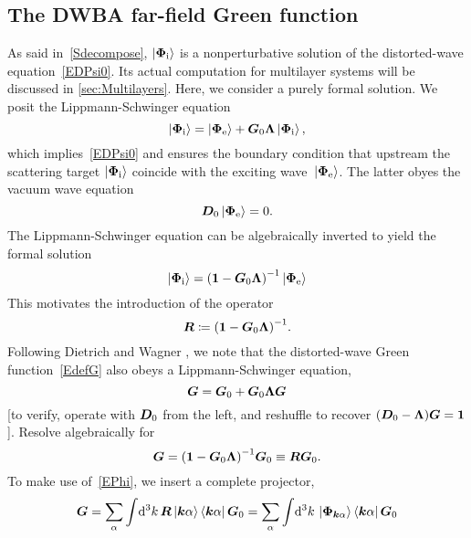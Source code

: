 \subsection{The DWBA far-field Green function}\label{SDWGreen}

As said in~\cref{Sdecompose},
 $\ket{\bm{\Phi}_{\text{i}}}$ is a nonperturbative solution
of the distorted-wave equation~\cref{EDPsi0}.
Its actual computation for multilayer systems will be discussed in \cref{sec:Multilayers}.
Here, we consider a purely formal solution.
We posit the Lippmann-Schwinger equation
\begin{equation}\label{ELS2}
  \ket{\v\Phi_\si}
  = \ket{\v\Phi_\text{e}} + \TGo\TL\ket{\v\Phi_\si},
\end{equation}
which implies~\cref{EDPsi0} and ensures the boundary condition that
upstream the scattering target
$\ket{\bm{\Phi}_{\text{i}}}$ coincide with the exciting wave~$\ket{\bm{\Phi}_\text{e}}$.
The latter obyes the vacuum wave equation
\begin{equation}
  \bm{D}_0\ket{\bm{\Phi}_\text{e}}=0.
\end{equation}
The Lippmann-Schwinger equation can be algebraically inverted to
yield the formal solution
\begin{equation}\label{EPhi}
  \ket{\v\Phi_\si} = {(\v1-\TGo\TL)}^{-1}\ket{\v\Phi_\text{e}}
\end{equation}
This motivates the introduction of the operator
\begin{equation}
  \bm{R} \coloneqq {(\bm{1}-\bm{G}_0\bm{\Lambda})}^{-1}.
\end{equation}
Following Dietrich and Wagner \cite{DiWa84,DiWa85,DiWa16},
we note that the distorted-wave Green function~\cref{EdefG}
also obeys a Lippmann-Schwinger equation,
\begin{equation}
   \bm{G} = \bm{G}_0 + \bm{G}_0\bm{\Lambda}\bm{G}
\end{equation}
[to verify, operate with $\bm{D}_0$ from the left, and reshuffle to recover $(\bm{D}_0-\bm{\Lambda})\bm{G}=\bm{1}$].
Resolve algebraically for
\begin{equation}
  \bm{G}  = {(\bm{1}-\bm{G}_0\bm{\Lambda})}^{-1} \bm{G}_0 \equiv \bm{R}\bm{G}_0.
\end{equation}
To make use of~\cref{EPhi},
we insert a complete projector,
\begin{equation}
  \bm{G}  = \sum_\alpha \int\!\mathrm d^3k\,\bm{R}\ket{{{\bm{k}}\alpha}}\bra{{{\bm{k}}\alpha}}\bm{G}_0
       = \sum_\alpha \int\!\mathrm d^3k\,\ket{\bm{\Phi}_{{\bm{k}}\alpha}}\bra{{{\bm{k}}\alpha}}\bm{G}_0
\end{equation}
